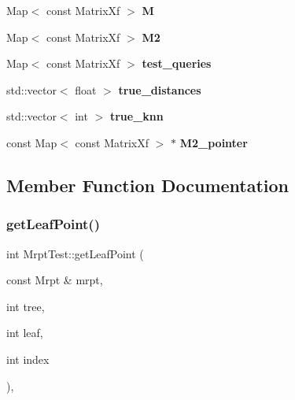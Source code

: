 \begin{DoxyCompactItemize}
Map$<$ const Matrix\+Xf $>$ {\bfseries M}
\item 
\mbox{\label{class_mrpt_test_aa144675bd97f66a9bbc99f9000817b9e}} 
Map$<$ const Matrix\+Xf $>$ {\bfseries M2}
\item 
\mbox{\label{class_mrpt_test_a926776501a519880425e8f96573e719e}} 
Map$<$ const Matrix\+Xf $>$ {\bfseries test\+\_\+queries}
\item 
\mbox{\label{class_mrpt_test_aecfd31ef605ec06fa0c25d5dc6a3cd22}} 
std\+::vector$<$ float $>$ {\bfseries true\+\_\+distances}
\item 
\mbox{\label{class_mrpt_test_a92b151c5588efad4332e73ca921e68be}} 
std\+::vector$<$ int $>$ {\bfseries true\+\_\+knn}
\item 
\mbox{\label{class_mrpt_test_a4a1d42172a04d98952c0002eb39eaf8d}} 
const Map$<$ const Matrix\+Xf $>$ $\ast$ {\bfseries M2\+\_\+pointer}
\end{DoxyCompactItemize}


\subsection{Member Function Documentation}
\mbox{\label{class_mrpt_test_a0f86fdf9acb69beaf6ba83bdb612328f}} 
\subsubsection{\texorpdfstring{get\+Leaf\+Point()}{getLeafPoint()}\hspace{0.1cm}{\footnotesize\ttfamily [1/2]}}
{\footnotesize\ttfamily int Mrpt\+Test\+::get\+Leaf\+Point (\begin{DoxyParamCaption}\item[{const Mrpt \&}]{mrpt,  }\item[{int}]{tree,  }\item[{int}]{leaf,  }\item[{int}]{index }\end{DoxyParamCaption})\hspace{0.3cm}{\ttfamily [inline]}, {\ttfamily [protected]}}

